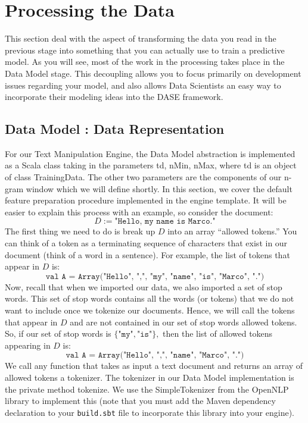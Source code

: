 \documentclass[a4paper,12pt]{article}
\renewcommand{\tt}[1]{\texttt{#1}}
\newcommand{\3}{\left}
\newcommand{\4}{\right}
\renewcommand{\-}[1]{{}^{-#1}}
\begin{document}
\section*{Processing the Data}

This section deal with the aspect of transforming the data you read in the previous stage into something that you can actually use to train a predictive model. As you will see, most of the work in the processing takes place in the Data Model stage. This decoupling allows you to focus primarily on development issues regarding your model, and also allows Data Scientists an easy way to incorporate their modeling ideas into the DASE framework. 

\subsection*{Data Model : Data Representation}

For our Text Manipulation Engine, the Data Model abstraction is implemented as a Scala class taking in the parameters td, nMin, nMax, where td is an object of class TrainingData. The other two parameters are the components of our n-gram window which we will define shortly. In this section, we cover the default feature preparation procedure implemented in the engine template. It will be easier to explain this process with an example, so consider the document:
$$
D := \tt{"Hello, my name is Marco."}
$$
The first thing we need to do is break up $D$ into an array \enquote{allowed tokens.} You can think of a token as a terminating sequence of characters that exist in our document (think of a word in a sentence). For example, the list of tokens that appear in $D$ is:
$$
\tt{val A = Array("Hello", ",", "my",  "name", "is", "Marco", ".")}
$$
Now, recall that when we imported our data, we also imported a set of stop words. This set of stop words contains all the words (or tokens) that we do not want to include once we tokenize our documents. Hence, we will call the tokens that appear in $D$ and are not contained in our set of stop words allowed tokens. So, if our set of stop words is $\{\tt{"my"}, \tt{"is"}\},$ then the list of allowed tokens appearing in $D$ is:
$$
\tt{val A = Array("Hello", ",",  "name", "Marco", ".")}
$$
We call any function that takes as input a text document and returns an array of allowed tokens a tokenizer. The tokenizer in our Data Model implementation is the private method tokenize. We use the SimpleTokenizer from the OpenNLP library to implement this (note that you must add the Maven dependency declaration to your \tt{build.sbt} file to incorporate this library into your engine).
\end{document}
